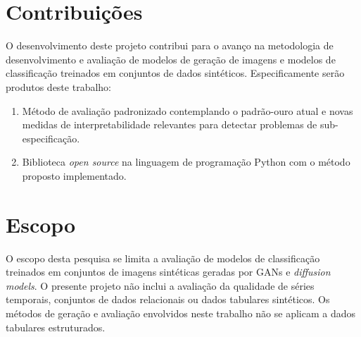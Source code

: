 


\section{Contribuições}
O desenvolvimento deste projeto contribui para o avanço na metodologia de desenvolvimento e avaliação de modelos de geração de imagens e modelos de classificação treinados em conjuntos de dados sintéticos. Especificamente serão produtos deste trabalho:

\begin{enumerate}
    \item Método de avaliação padronizado contemplando o padrão-ouro atual e novas medidas de interpretabilidade relevantes para detectar problemas de sub-especificação.
    \item Biblioteca \textit{open source} na linguagem de programação Python com o método proposto implementado.
\end{enumerate}


\section{Escopo}

O escopo desta pesquisa se limita a avaliação de modelos de classificação treinados em conjuntos de imagens sintéticas geradas por GANs e \textit{diffusion models}. O presente projeto não inclui a avaliação da qualidade de séries temporais, conjuntos de dados relacionais ou dados tabulares sintéticos. Os métodos de geração e avaliação envolvidos neste trabalho não se aplicam a dados tabulares estruturados.
